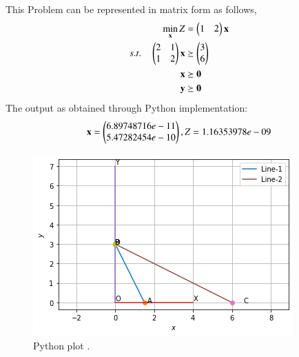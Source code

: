 \documentclass[journal,12pt,twocolumn]{IEEEtran}
\begin{document}
This Problem can be represented in matrix form as follows,\\
    \begin{align}
        \min_{\mathbf{x}} Z &= \begin{pmatrix}1 & 2\end{pmatrix}\mathbf{x}\\
        s.t. \quad 
        \begin{pmatrix}
        2 & 1\\
        1 & 2
        \end{pmatrix}
        \mathbf{x} &\succeq \begin{pmatrix}3\\6\end{pmatrix} \\
        \mathbf{x} &\succeq \mathbf{0}\\
        \mathbf{y} &\succeq \mathbf{0}
    \end{align}
The output as obtained through Python implementation:
\begin{align}
    \mathbf{x} = \begin{pmatrix}6.89748716e-11\\5.47282454e-10\end{pmatrix}, Z = 1.16353978e-09
    \end{align}
 \begin{figure}
 \includegraphics[width=\linewidth]{minimize.png}
  \caption{Python plot .}
  \label{fig:Fig3}
 \end{figure}
\end{document}
